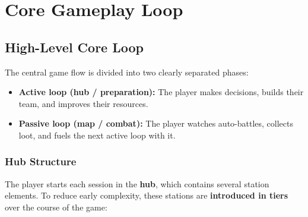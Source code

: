 \section{Core Gameplay Loop}
\label{sec:core-gameplay-loop}

\subsection{High-Level Core Loop}

The central game flow is divided into two clearly separated phases:

\begin{itemize}
	\item \textbf{Active loop (hub / preparation):} The player makes decisions, builds their team, and improves their resources.
	\item \textbf{Passive loop (map / combat):} The player watches auto-battles, collects loot, and fuels the next active loop with it.
\end{itemize}

\subsubsection*{Hub Structure}

The player starts each session in the \textbf{hub}, which contains several station elements.  
To reduce early complexity, these stations are \textbf{introduced in tiers} over the course of the game:


